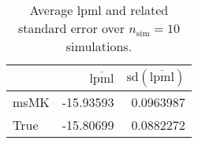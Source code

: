 \begin{table}[H]

\caption{Average lpml and related standard error over $n_{\text{sim}} = 10$ simulations.}
\centering
\begin{tabular}[t]{lrr}
\toprule
  & $\overbar{\text{lpml}}$ & $\text{sd}(\overbar{\text{lpml}})$\\
\midrule
msMK & -15.93593 & 0.0963987\\
True & -15.80699 & 0.0882272\\
\bottomrule
\end{tabular}
\end{table}